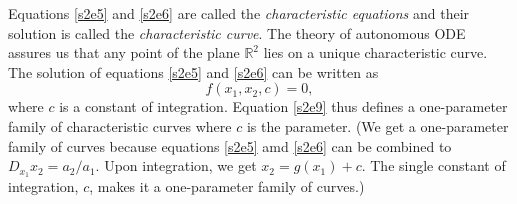 \documentclass{article}
\theoremstyle{plain}
\numberwithin{thm}{section}
\theoremstyle{plain}
\numberwithin{prop}{section}
\theoremstyle{definition}
\numberwithin{defn}{section}
\theoremstyle{remark}
\numberwithin{equation}{section}
\begin{document}
Equations \eqref{s2e5} and \eqref{s2e6} are called the \emph{characteristic equations} and their
solution is called the \emph{characteristic curve}. The theory of autonomous ODE assures us that
any point of the plane $\mathbb{R}^2$ lies on a unique characteristic curve. The solution of equations 
\eqref{s2e5} and \eqref{s2e6} can be written as
\begin{equation}\label{s2e9}
f(x_1, x_2, c) = 0,
\end{equation}
where $c$ is a constant of integration. Equation \eqref{s2e9} thus defines a one-parameter family
of characteristic curves where $c$ is the parameter. (We get a one-parameter family of curves because
equations \eqref{s2e5} amd \eqref{s2e6} can be combined to $D_{x_1}x_2 = a_2/a_1$. Upon integration,
we get $x_2 = g(x_1) + c$. The single constant of integration, $c$, makes it a one-parameter family
of curves.)
\end{document}
